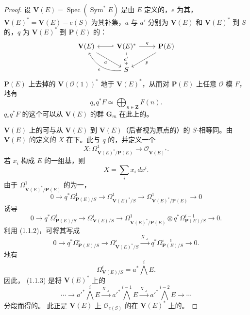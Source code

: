 \begin{proof}
设 $\mathbf V(E)=\operatorname{Spec}(\operatorname{Sym}^*E)$ 是由 $E$ 定义的，$e$ 为其，$\mathbf V(E)^*=\mathbf V(E)-e(S)$ 为其补集，$a$ 与 $a'$ 分别为 $\mathbf V(E)$ 和 $\mathbf V(E)^*$ 到 $S$ 的，$q$ 为 $\mathbf V(E)^*$ 到 $\mathbf P(E)$ 的：
\[
\begin{tikzcd}
\mathbf V(E)\arrow[dr,"a"'] & \mathbf V(E)^*\arrow[l,hook']\arrow[r,"q"]\arrow[d,"a'" description] & \mathbf P(E)\arrow[dl,"p"]\\
& S\arrow[ul,"e",bend left=35] &
\end{tikzcd}
\]
$\mathbf P(E)$ 上去掉的 $\mathbf V(\mathcal O(1))^*$ 地于 $\mathbf V(E)^*$，从而对 $\mathbf P(E)$ 上任意 $\mathcal O$ 模 $F$，地有
\[
 q_*q^*F\simeq\bigoplus_{n\in\mathbf Z}F(n).\tag{1.1.1}
\]
$q_*q^*F$ 的这个可以从 $\mathbf V(E)$ 的群 $\mathbf G_m$ 在此上的。

$\mathbf V(E)$ 上的可与从 $\mathbf V(E)$ 到 $\mathbf V(E)$（后者视为原点的）的 $S$-相等同。由 $\mathbf V(E)$ 的定义的 $X$ 在下。此与 $q$ 的，并定义一个
\[
 X:\Omega^1_{\mathbf V(E)^*/\mathbf P(E)}\longrightarrow\mathcal O_{\mathbf V(E)^*}.\tag{1.1.2}
\]
若 $x_i$ 构成 $E$ 的一组基，则
\[
 X=\sum_i x_i\,dx^i.
\]
由于 $\Omega^1_{\mathbf V(E)^*/\mathbf P(E)}$ 的为一，
\[
0\longrightarrow q^*\Omega^1_{\mathbf P(E)/S}\longrightarrow\Omega^1_{\mathbf V(E)^*/S}\longrightarrow\Omega^1_{\mathbf V(E)^*/\mathbf P(E)}\longrightarrow0
\]
诱导
\[
0\longrightarrow q^*\Omega^i_{\mathbf P(E)/S}\longrightarrow\Omega^i_{\mathbf V(E)/S}\longrightarrow\Omega^1_{\mathbf V(E)^*/\mathbf P(E)}\otimes q^*\Omega^{i-1}_{\mathbf P(E)/S}\longrightarrow0.
\]
利用 (1.1.2)，可将其写成
\[
0\longrightarrow q^*\Omega^i_{\mathbf P(E)/S}\longrightarrow\Omega^i_{\mathbf V(E)^*/S}\xrightarrow{X\mathbin{\lrcorner}}q^*\Omega^{i-1}_{\mathbf P(E)/S}\longrightarrow0.\tag{1.1.3}
\]
地有
\[
 \Omega^i_{\mathbf V(E)/S}=a^*\bigwedge^iE.\tag{1.1.4}
\]
因此， (1.1.3) 是将 $\mathbf V(E)^*$ 上的
\[
 \cdots\longrightarrow a'^*\bigwedge^iE\xrightarrow{X\mathbin{\lrcorner}}a'^*\bigwedge^{i-1}E\xrightarrow{X\mathbin{\lrcorner}}a'^*\bigwedge^{i-2}E\longrightarrow\cdots\tag{1.1.5}
\]
分段而得的。
此正是 $\mathbf V(E)$ 上 $\mathcal O_{e(S)}$ 的在 $\mathbf V(E)^*$ 上的。


\end{proof}
